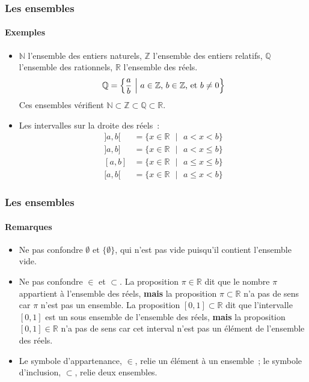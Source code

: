 \documentclass[10pt,notheorems]{beamer}
\theoremstyle{plain}
\theoremstyle{definition} %
\begin{document}
\begin{frame}
  \frametitle{Les ensembles}
  \framesubtitle{Exemples}
  \hypertarget{slide_ensembles_exemples}{}

  \begin{itemize}

  \item $\mathbb N$ l'ensemble des entiers naturels, $\mathbb Z$
    l'ensemble des entiers relatifs, $\mathbb Q$ l'ensemble des
    rationnels, $\mathbb R$ l'ensemble des réels.
    \[
      \mathbb Q = \left\{ \frac{a}{b}\text{ }\Bigl|\text{ }a\in\mathbb Z\text{, }b\in\mathbb Z\text{, et }b\neq 0\right\}
    \]
    Ces ensembles vérifient $\mathbb N \subset \mathbb Z \subset \mathbb Q \subset \mathbb R$.\newline

  \item Les intervalles sur la droite des réels~:
    \[
      \begin{split}
        ]a,b[ &= \{x\in\mathbb R\text{ }|\text{ }a<x<b\}\\
        ]a,b] &= \{x\in\mathbb R\text{ }|\text{ }a<x\leq b\}\\
        [a,b] &= \{x\in\mathbb R\text{ }|\text{ }a\leq x\leq b\}\\
        [a,b[ &= \{x\in\mathbb R\text{ }|\text{ }a\leq x< b\}
      \end{split}
    \]

  \end{itemize}

\end{frame}


\begin{frame}
  \frametitle{Les ensembles}
  \framesubtitle{Remarques}
  \hypertarget{slide_ensembles_remarques}{}

  \begin{itemize}

  \item[\dbend] Ne pas confondre $\emptyset$ et $\{\emptyset\}$, qui n'est pas vide puisqu'il contient l'ensemble vide.\newline

  \item[\dbend] Ne pas confondre $\in$ et $\subset$. La proposition $\pi\in\mathbb R$ dit que le nombre $\pi$ appartient à l'ensemble des réels, \textbf{mais} la proposition $\pi\subset\mathbb R$ n'a pas de sens car $\pi$ n'est pas un ensemble. La proposition $[0,1]\subset\mathbb R$ dit que l'intervalle $[0,1]$ est un sous ensemble de l'ensemble des réels, \textbf{mais} la proposition $[0,1]\in\mathbb R$ n'a pas de sens car cet interval n'est pas un élément de l'ensemble des réels.\newline

  \item Le symbole d'appartenance, $\in$, relie un élément à un ensemble ; le symbole d'inclusion, $\subset$, relie deux ensembles.\newline
  \end{itemize}

\end{frame}
\end{document}
